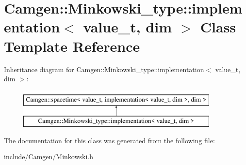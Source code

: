 \hypertarget{a00292}{\section{Camgen\-:\-:Minkowski\-\_\-type\-:\-:implementation$<$ value\-\_\-t, dim $>$ Class Template Reference}
\label{a00292}
}
Inheritance diagram for Camgen\-:\-:Minkowski\-\_\-type\-:\-:implementation$<$ value\-\_\-t, dim $>$\-:\begin{figure}[H]
\begin{center}
\leavevmode
\includegraphics[height=2.000000cm]{a00292}
\end{center}
\end{figure}


The documentation for this class was generated from the following file\-:\begin{DoxyCompactItemize}
\item 
include/\-Camgen/Minkowski.\-h\end{DoxyCompactItemize}
